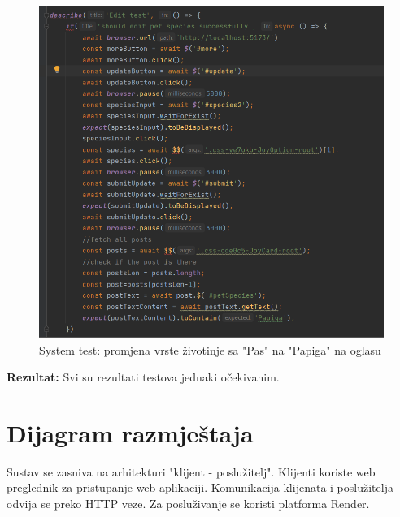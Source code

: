 			\begin{figure}[H]
				\includegraphics[scale=0.7]{slike/sysedit1.PNG} 
				\centering
				\caption{System test: promjena vrste životinje sa "Pas" na "Papiga" na oglasu}
				\label{dijagram_razmjestaja}
			\end{figure}
			
			\textbf{Rezultat:}
			Svi su rezultati testova jednaki očekivanim.\\
			
			\eject 
		
		
		\section{Dijagram razmještaja}
			
			Sustav se zasniva na arhitekturi "klijent - poslužitelj". Klijenti koriste web preglednik za pristupanje web aplikaciji. Komunikacija klijenata i poslužitelja odvija se preko HTTP veze. Za posluživanje se koristi platforma Render.
			 
